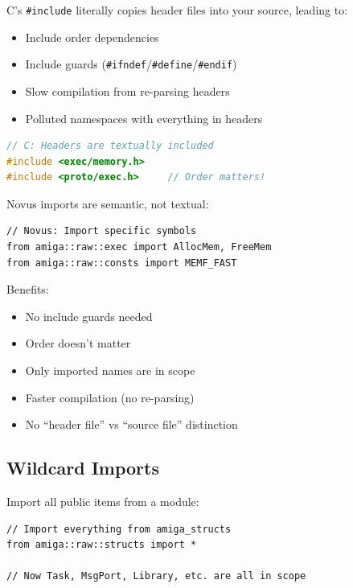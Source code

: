 \begin{comingfromc}
C's \texttt{\#include} literally copies header files into your source, leading to:
\begin{itemize}
    \item Include order dependencies
    \item Include guards (\texttt{\#ifndef}/\texttt{\#define}/\texttt{\#endif})
    \item Slow compilation from re-parsing headers
    \item Polluted namespaces with everything in headers
\end{itemize}

\begin{lstlisting}[language=C]
// C: Headers are textually included
#include <exec/memory.h>
#include <proto/exec.h>     // Order matters!
\end{lstlisting}

Novus imports are semantic, not textual:

\begin{lstlisting}
// Novus: Import specific symbols
from amiga::raw::exec import AllocMem, FreeMem
from amiga::raw::consts import MEMF_FAST
\end{lstlisting}

Benefits:
\begin{itemize}
    \item No include guards needed
    \item Order doesn't matter
    \item Only imported names are in scope
    \item Faster compilation (no re-parsing)
    \item No ``header file'' vs ``source file'' distinction
\end{itemize}
\end{comingfromc}

\subsection{Wildcard Imports}
\label{subsec:wildcard-imports}

Import all public items from a module:

\begin{lstlisting}
// Import everything from amiga_structs
from amiga::raw::structs import *

// Now Task, MsgPort, Library, etc. are all in scope
\end{lstlisting}

